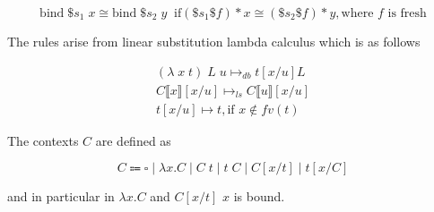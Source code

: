 \documentclass[acmsmall,screen, nonacm, anonymous]{acmart}
\begin{document}
\[
\text{bind}\;\$s_1\; x \cong \text{bind}\;\$s_2\;y \;\; \text{if} (\$s_1 \$f) * x \cong (\$s_2 \$f) * y, \text{where $f$ is fresh}
\]

\begin{remark}

The rules arise from linear substitution lambda calculus which is as follows

\begin{align*}
(\lambda\;x\;t)\;L\;u \mapsto_{db} t[x / u]L\\
C\llbracket x \rrbracket [x / u] \mapsto_{ls} C \llbracket u \rrbracket [x / u]\\
t[x/u] \mapsto t, \text{if } x \not \in fv(t)
\end{align*}

The contexts $C$ are defined as

\[
C \Coloneqq \square \;|\; \lambda x . C \; | \; C\;t \;|\; t\;C\;|\;C[x / t]\;|\;t[x / C]
\]

and in particular in $\lambda x . C$ and $C[x/t]$ $x$ is bound.

\end{remark}



\end{document}
